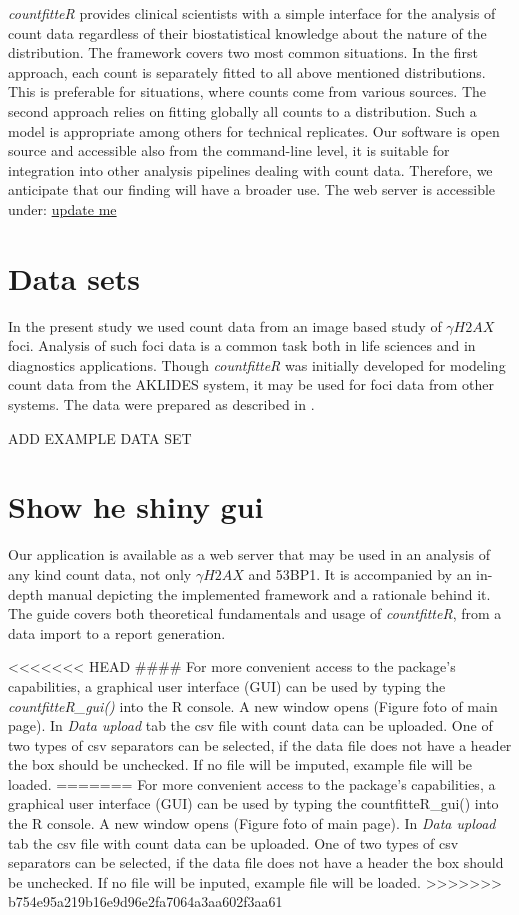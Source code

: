 \emph{countfitteR} provides clinical scientists with a simple interface for the analysis of count data regardless of their biostatistical knowledge about the nature of the distribution. The framework covers two most common situations. In the first approach, each count is separately fitted to all above mentioned distributions. This is preferable for situations, where counts come from various sources. The second approach relies on fitting globally all counts to a distribution. Such a model is appropriate among others for technical replicates.
Our software is open source and accessible also from the command-line level, it is suitable for integration into other analysis pipelines dealing with count data. Therefore, we anticipate that our finding will have a broader use. 
The web server is accessible under: 
\url{update me}

\section{Data sets}
In the present study we used count data from an image based study of $\gamma H2AX$ foci. Analysis of such foci data is a common task both in life sciences and in diagnostics applications. Though \emph{countfitteR} was initially developed for modeling count data from the AKLIDES system, it may be used for foci data from other systems.
The data were prepared as described in \citep{rodiger_quantification_2018}.

ADD EXAMPLE DATA SET

\section{Show he shiny gui}

Our application is available as a web server that may be used in an analysis of any kind count data, not only $\gamma H2AX$ and 53BP1. It is accompanied by an in-depth manual depicting the implemented framework and a rationale behind it. The guide covers both theoretical fundamentals and usage of \emph{countfitteR}, from a data import to a report generation.

<<<<<<< HEAD
####
For more convenient access to the package’s capabilities, a graphical user interface (GUI) can be used by typing the \emph{countfitteR\_gui()} into the R console. A new window opens (Figure foto of main page). In \textit{Data upload} tab the csv file with count data can be uploaded. One of two types of csv separators can be selected, if the data file does not have a header the box should be unchecked. If no file will be imputed, example file will be loaded.
=======
For more convenient access to the package’s capabilities, a graphical user interface (GUI) can be used by typing the countfitteR\_gui() into the R console. A new window opens (Figure foto of main page). In \textit{Data upload} tab the csv file with count data can be uploaded. One of two types of csv separators can be selected, if the data file does not have a header the box should be unchecked. If no file will be inputed, example file will be loaded.
>>>>>>> b754e95a219b16e9d96e2fa7064a3aa602f3aa61

